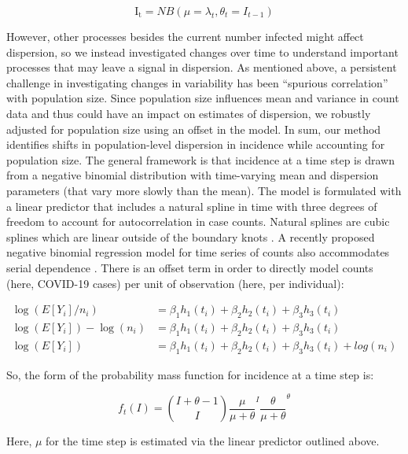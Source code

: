 \documentclass[10pt,letterpaper]{article}
\begin{document}
\begin{equation}
    \mathrm{I_t} = NB(\mu = \lambda_t, \theta_t = I_{t-1})
\end{equation}

\noindent However, other processes besides the current number infected might affect dispersion, so we instead investigated changes over time to understand important processes that may leave a signal in dispersion. 
As mentioned above, a persistent challenge in investigating changes in variability has been ``spurious correlation'' with population size. 
Since population size influences mean and variance in count data and thus could have an impact on estimates of dispersion, we robustly adjusted for population size using an offset in the model. 
In sum, our method identifies shifts in population-level dispersion in incidence while accounting for population size. 
The general framework is that incidence at a time step is drawn from a negative binomial distribution with time-varying mean and dispersion parameters (that vary more slowly than the mean). 
The model is formulated with a linear predictor that includes a natural spline in time with three degrees of freedom to account for autocorrelation in case counts. 
Natural splines are cubic splines which are linear outside of the boundary knots \cite{perperoglou_review_2019}. 
A recently proposed negative binomial regression model for time series of counts also accommodates serial dependence \cite{davis_negative_2009}. 
There is an offset term in order to directly model counts (here, COVID-19 cases) per unit of observation (here, per individual):

\begin{align}
  \log(E[Y_i]/n_i) &= \beta_1h_1(t_i) + \beta_2h_2(t_i) + \beta_3h_3(t_i) \\
  \log(E[Y_i])-\log(n_i) &= \beta_1h_1(t_i) + \beta_2h_2(t_i) + \beta_3h_3(t_i) \\ 
  \log(E[Y_i]) &= \beta_1 h_1(t_i) + \beta_2h_2(t_i) + \beta_3 h_3(t_i) + log(n_i) 
\end{align}

So, the form of the probability mass function for incidence at a time step is:

\begin{equation}
  f_t(I) = \binom{I + \theta - 1}{I} \dfrac{\mu}{\mu+\theta}^I \dfrac{\theta}{\mu +\theta}^\theta
\end{equation}

Here, \begin{math}\mu\end{math} for the time step is estimated via the linear predictor outlined above.
\end{document}
